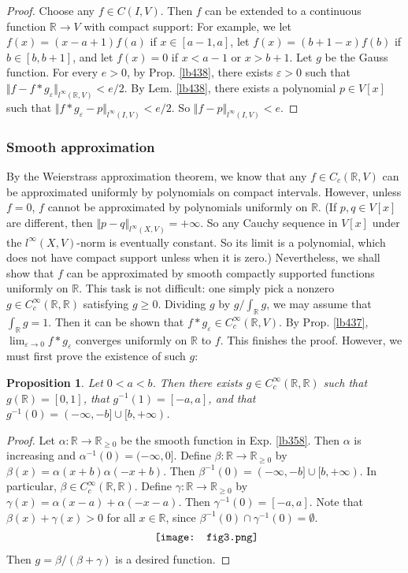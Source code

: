 \documentclass[12pt,b5paper,notitlepage]{article}
\theoremstyle{definition}
\theoremstyle{plain}
\newtheorem{pp}[df]{Proposition}
\newcommand{\Rbb}{\mathbb R}
\newcommand{\eps}{\varepsilon}
\numberwithin{equation}{section}
\begin{document}
\begin{proof}
Choose any $f\in C(I,V)$. Then $f$ can be extended to a continuous function $\Rbb\rightarrow V$ with compact support: For example, we let $f(x)=(x-a+1)f(a)$ if $x\in[a-1,a]$, let $f(x)=(b+1-x)f(b)$ if $b\in[b,b+1]$, and let $f(x)=0$ if $x<a-1$ or $x>b+1$. Let $g$ be the Gauss function. For every $e>0$, by Prop. \ref{lb438}, there exists $\eps>0$ such that $\Vert f-f*g_\eps\Vert_{l^\infty(\Rbb,V)}<e/2$. By Lem. \ref{lb438}, there exists a polynomial $p\in V[x]$ such that $\Vert f*g_\eps-p\Vert_{l^\infty(I,V)}<e/2$. So $\Vert f-p\Vert_{l^\infty(I,V)}<e$.
\end{proof}



\subsubsection{Smooth approximation}

By the Weierstrass approximation theorem, we know that any $f\in C_c(\Rbb,V)$ can be approximated uniformly by polynomials on compact intervals. However, unless $f=0$, $f$ cannot be approximated by polynomials uniformly on $\Rbb$. (If $p,q\in V[x]$ are different, then $\Vert p-q\Vert_{l^\infty(X,V)}=+\infty$. So any Cauchy sequence in $V[x]$ under the ${l^\infty(X,V)}$-norm is eventually constant. So its limit is a polynomial, which does not have compact support unless when it is zero.) Nevertheless, we shall show that $f$ can be approximated by smooth compactly supported functions uniformly on $\Rbb$. This task is not difficult: one simply pick a nonzero $g\in C_c^\infty(\Rbb,\Rbb)$ satisfying $g\geq0$. Dividing $g$ by $g/\int_\Rbb g$, we may assume that $\int_\Rbb g=1$. Then it can be shown that $f*g_\eps\in C_c^\infty(\Rbb,V)$. By Prop. \ref{lb437}, $\lim_{\eps\rightarrow0}f*g_\eps$ converges uniformly on $\Rbb$ to $f$. This finishes the proof. However, we must first prove the existence of such $g$:

\begin{pp}\label{lb440}
Let $0<a<b$. Then there exists $g\in C_c^\infty(\Rbb,\Rbb)$ such that $g(\Rbb)=[0,1]$, that $g^{-1}(1)=[-a,a]$, and that $g^{-1}(0)=(-\infty,-b]\cup[b,+\infty)$.
\end{pp}



\begin{proof}
Let $\alpha:\Rbb\rightarrow\Rbb_{\geq0}$ be the smooth function in Exp. \ref{lb358}. Then $\alpha$ is increasing and $\alpha^{-1}(0)=(-\infty,0]$.  Define $\beta:\Rbb\rightarrow\Rbb_{\geq0}$ by $\beta(x)=\alpha(x+b)\alpha(-x+b)$. Then $\beta^{-1}(0)=(-\infty,-b]\cup[b,+\infty)$. In particular, $\beta\in C_c^\infty(\Rbb,\Rbb)$. Define $\gamma:\Rbb\rightarrow\Rbb_{\geq0}$ by $\gamma(x)=\alpha(x-a)+\alpha(-x-a)$. Then $\gamma^{-1}(0)=[-a,a]$. Note that $\beta(x)+\gamma(x)>0$ for all $x\in\Rbb$, since $\beta^{-1}(0)\cap\gamma^{-1}(0)=\emptyset$. 
\begin{align*}
\vcenter{\hbox{{
			\texttt{[image: fig3.png]}}}}
\end{align*}
Then $g=\beta/(\beta+\gamma)$ is a desired function.
\end{proof}
\end{document}
